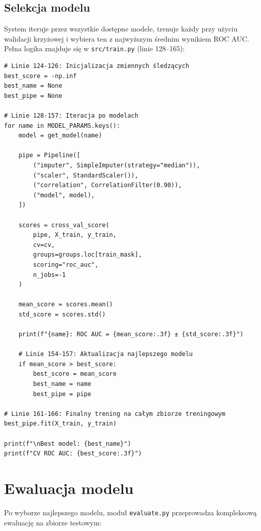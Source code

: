 \documentclass[12pt]{article}
\begin{document}
\subsection{Selekcja modelu}

System iteruje przez wszystkie dostępne modele, trenuje każdy przy użyciu walidacji krzyżowej i wybiera ten z najwyższym średnim wynikiem ROC AUC. Pełna logika znajduje się w \texttt{src/train.py} (linie 128--165):

\begin{lstlisting}[caption={\texttt{src/train.py} (linie 124--165): Pętla selekcji modelu}]
# Linie 124-126: Inicjalizacja zmiennych śledzących
best_score = -np.inf
best_name = None
best_pipe = None

# Linie 128-157: Iteracja po modelach
for name in MODEL_PARAMS.keys():
    model = get_model(name)

    pipe = Pipeline([
        ("imputer", SimpleImputer(strategy="median")),
        ("scaler", StandardScaler()),
        ("correlation", CorrelationFilter(0.90)),
        ("model", model),
    ])

    scores = cross_val_score(
        pipe, X_train, y_train,
        cv=cv,
        groups=groups.loc[train_mask],
        scoring="roc_auc",
        n_jobs=-1
    )

    mean_score = scores.mean()
    std_score = scores.std()

    print(f"{name}: ROC AUC = {mean_score:.3f} ± {std_score:.3f}")

    # Linie 154-157: Aktualizacja najlepszego modelu
    if mean_score > best_score:
        best_score = mean_score
        best_name = name
        best_pipe = pipe

# Linie 161-166: Finalny trening na całym zbiorze treningowym
best_pipe.fit(X_train, y_train)

print(f"\nBest model: {best_name}")
print(f"CV ROC AUC: {best_score:.3f}")
\end{lstlisting}

\section{Ewaluacja modelu}

Po wyborze najlepszego modelu, moduł \texttt{evaluate.py} przeprowadza kompleksową ewaluację na zbiorze testowym:
\end{document}
